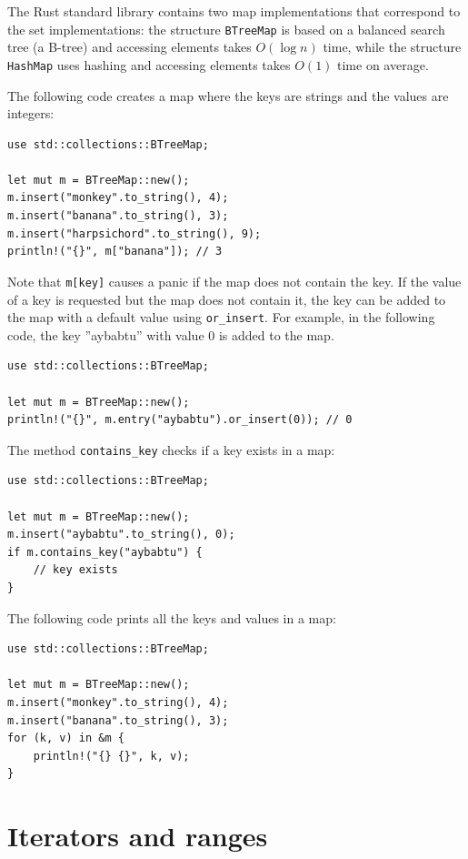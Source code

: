 The Rust standard library contains two map
implementations that correspond to the set
implementations: the structure
\texttt{BTreeMap} is based on a balanced
search tree (a B-tree) and accessing elements
takes $O(\log n)$ time,
while the structure
\texttt{HashMap} uses hashing
and accessing elements takes $O(1)$ time on average.

The following code creates a map
where the keys are strings and the values are integers:

\begin{lstlisting}
use std::collections::BTreeMap;

let mut m = BTreeMap::new();
m.insert("monkey".to_string(), 4);
m.insert("banana".to_string(), 3);
m.insert("harpsichord".to_string(), 9);
println!("{}", m["banana"]); // 3
\end{lstlisting}

Note that \texttt{m[key]} causes a panic
if the map does not contain the key.
If the value of a key is requested
but the map does not contain it,
the key can be added to the map with
a default value using \texttt{or\_insert}.
For example, in the following code,
the key ''aybabtu'' with value 0
is added to the map.

\begin{lstlisting}
use std::collections::BTreeMap;

let mut m = BTreeMap::new();
println!("{}", m.entry("aybabtu").or_insert(0)); // 0
\end{lstlisting}
The method \texttt{contains\_key} checks
if a key exists in a map:
\begin{lstlisting}
use std::collections::BTreeMap;

let mut m = BTreeMap::new();
m.insert("aybabtu".to_string(), 0);
if m.contains_key("aybabtu") {
    // key exists
}
\end{lstlisting}
The following code prints all the keys and values
in a map:
\begin{lstlisting}
use std::collections::BTreeMap;

let mut m = BTreeMap::new();
m.insert("monkey".to_string(), 4);
m.insert("banana".to_string(), 3);
for (k, v) in &m {
    println!("{} {}", k, v);
}
\end{lstlisting}

\section{Iterators and ranges}


